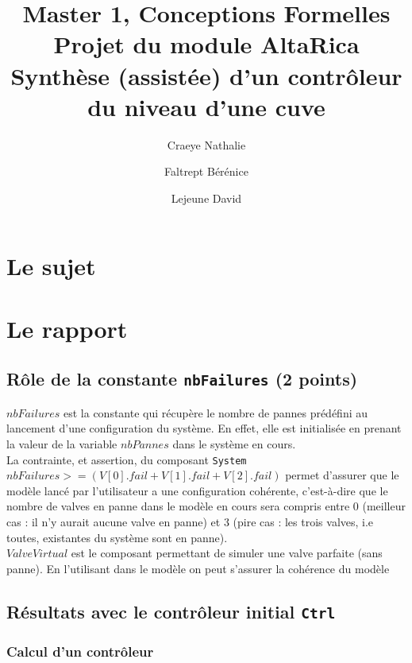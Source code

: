 \documentclass[a4paper]{book}
\newcommand{\altarica}{{\sc AltaRica}}
\begin{document}
\title{Master 1, Conceptions Formelles\\
Projet du module \altarica\\
Synthèse (assistée) d'un contrôleur du niveau d'une cuve}

\date{}

\author{Craeye Nathalie \and Faltrept Bérénice \and Lejeune David}

\maketitle

\chapter{Le sujet}


\chapter{Le rapport}
\section{Rôle de la constante {\tt nbFailures} (2 points)}

$nbFailures$ est la constante qui récupère le nombre de pannes prédéfini au lancement d'une configuration du système. En effet, elle est initialisée en prenant la valeur de la variable $nbPannes$ dans le système en cours. \\
La contrainte, et assertion, du composant {\tt System} $nbFailures >= (V[0].fail + V[1].fail + V[2].fail)$ permet d'assurer que le modèle lancé par l'utilisateur a une configuration cohérente, c'est-à-dire que le nombre de valves en panne dans le modèle en cours sera compris entre 0 (meilleur cas : il n'y aurait aucune valve en panne) et 3 (pire cas : les trois valves, i.e toutes, existantes du système sont en panne). \\

$ValveVirtual$ est le composant permettant de simuler une valve parfaite (sans panne). En l'utilisant dans le modèle on peut s'assurer la cohérence du modèle

\section{Résultats avec le contrôleur initial {\tt Ctrl}}

\subsection{Calcul d'un contrôleur}
\end{document}
